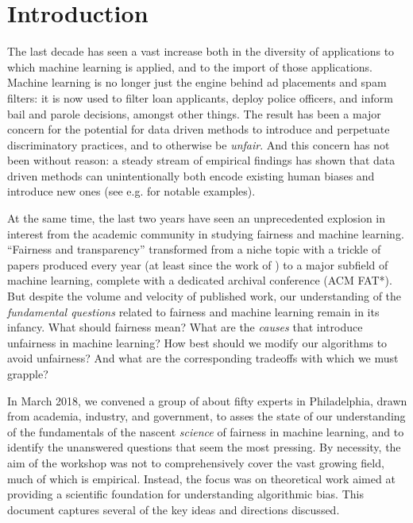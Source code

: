 \section{Introduction}

The last decade has seen a vast increase both in the diversity of applications to which machine learning is applied, and to the import of those applications. Machine learning is no longer just the engine behind ad placements and spam filters: it is now used to filter loan applicants, deploy police officers, and inform bail and parole decisions, amongst other things. The result has been a major concern for the potential for data driven methods to introduce and perpetuate discriminatory practices, and to otherwise be \emph{unfair}. And this concern has not been without reason: a steady stream of empirical findings has shown that data driven methods can unintentionally both encode existing human biases and introduce new ones (see e.g. \cite{swee13,bolukbasi2016man,CBN17,gendershades} for notable examples).

At the same time, the last two years have seen an unprecedented explosion in interest from the academic community in studying fairness and machine learning. ``Fairness and transparency'' transformed from a niche topic with a trickle of papers produced every year (at least since the work of \cite{PRT08}) to a major subfield of machine learning, complete with a dedicated archival conference (ACM FAT*). But despite the volume and velocity of published work, our understanding of the \emph{fundamental questions} related to fairness and machine learning remain in its infancy. What should fairness mean? What are the \emph{causes} that introduce unfairness in machine learning? How best should we modify our algorithms to avoid unfairness? And what are the corresponding tradeoffs with which we must grapple?

In March 2018, we convened a group of about fifty experts in Philadelphia, drawn from academia, industry, and government, to asses the state of our understanding of the fundamentals of the nascent \emph{science} of fairness in machine learning, and to identify the unanswered questions that seem the most pressing. By necessity, the aim of the workshop was not to comprehensively cover the vast growing field, much of which is empirical. Instead, the focus was on theoretical work aimed at providing a scientific foundation for understanding algorithmic bias. This document captures several of the key ideas and directions discussed.  